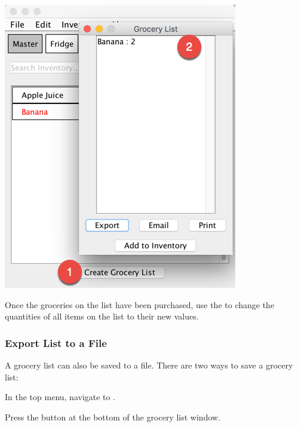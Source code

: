 \documentclass[letterpaper,12pt]{article}
\renewenvironment{enumerate}[1]{\begin{compactenum}#1}{\end{compactenum}}
\begin{document}
\centerline{\includegraphics[scale=0.5]{09.png}}


Once the groceries on the list have been purchased, use the  to change the quantities of all items on the list to their new values.

		\subsubsection{Export List to a File}
	A grocery list can also be saved to a file. There are two ways to save a grocery list:
		
\begin{enumerate}
\item In the top menu, navigate to .
\item Press the  button at the bottom of the grocery list window.

\end{enumerate}		
\end{document}

